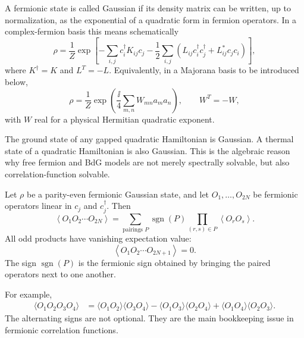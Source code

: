 A fermionic state is called Gaussian if its density matrix can be written, up to
normalization, as the exponential of a quadratic form in fermion operators.  In a
complex-fermion basis this means schematically
\begin{equation}
    \rho
    =\frac{1}{Z}
    \exp\left[-\sum_{i,j}c_i^\dagger K_{ij}c_j
    -\frac12\sum_{i,j}\left(
        L_{ij}c_i^\dagger c_j^\dagger+L_{ij}^*c_jc_i
    \right)\right],
\end{equation}
where $K^\dagger=K$ and $L^T=-L$.  Equivalently, in a Majorana basis to be
introduced below,
\begin{equation}
    \rho=\frac{1}{Z}\exp\left(\frac{\ii}{4}\sum_{m,n}W_{mn}a_ma_n\right),
    \qquad
    W^T=-W,
\end{equation}
with $W$ real for a physical Hermitian quadratic exponent.

The ground state of any gapped quadratic Hamiltonian is Gaussian.  A thermal
state of a quadratic Hamiltonian is also Gaussian.  This is the algebraic reason
why free fermion and BdG models are not merely spectrally solvable, but also
correlation-function solvable.

\begin{theorem}
\label{thm:wick-majorana}
Let $\rho$ be a parity-even fermionic Gaussian state, and let
$O_1,\ldots,O_{2N}$ be fermionic operators linear in $c_j$ and $c_j^\dagger$.
Then
\begin{equation}
\label{eq:wick-general-linear-fermion}
    \left\langle O_1O_2\cdots O_{2N}\right\rangle
    =
    \sum_{\text{pairings }P}
    \operatorname{sgn}(P)
    \prod_{(r,s)\in P}\left\langle O_rO_s\right\rangle .
\end{equation}
All odd products have vanishing expectation value:
\begin{equation}
    \left\langle O_1O_2\cdots O_{2N+1}\right\rangle=0.
\end{equation}
The sign $\operatorname{sgn}(P)$ is the fermionic sign obtained by bringing the
paired operators next to one another.
\end{theorem}

For example,
\begin{align}
\label{eq:wick-four-point-example}
    \langle O_1O_2O_3O_4\rangle
    &=
    \langle O_1O_2\rangle\langle O_3O_4\rangle
    -
    \langle O_1O_3\rangle\langle O_2O_4\rangle
    +
    \langle O_1O_4\rangle\langle O_2O_3\rangle .
\end{align}
The alternating signs are not optional.  They are the main bookkeeping issue in
fermionic correlation functions.

